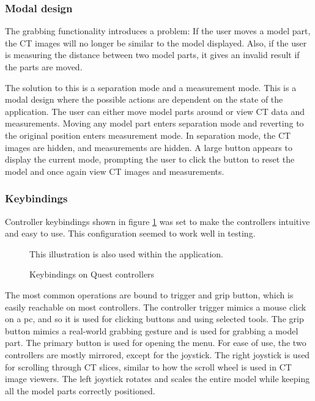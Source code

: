 \documentclass[a4paper]{report}
\begin{document}
\subsubsection{Modal design}
The grabbing functionality introduces a problem: If the user moves a model part, the CT images will no longer be similar to the model displayed. Also, if the user is measuring the distance between two model parts, it gives an invalid result if the parts are moved.

The solution to this is a separation mode and a measurement mode. This is a modal design where the possible actions are dependent on the state of the application. The user can either move model parts around or view CT data and measurements. Moving any model part enters separation mode and reverting to the original position enters measurement mode. In separation mode, the CT images are hidden, and measurements are hidden. A large button appears to display the current mode, prompting the user to click the button to reset the model and once again view CT images and measurements.

\subsubsection{Keybindings}
Controller keybindings shown in figure \ref{controllers} was set to make the controllers intuitive and easy to use. This configuration seemed to work well in testing.

\begin{figure}[h!]
    \centering
	\hfill
	\caption{Keybindings on Quest controllers}\label{controllers}
  \small
  This illustration is also used within the application.
\end{figure}

The most common operations are bound to trigger and grip button, which is easily reachable on most controllers. The controller trigger mimics a mouse click on a pc, and so it is used for clicking buttons and using selected tools. The grip button mimics a real-world grabbing gesture and is used for grabbing a model part.
The primary button is used for opening the menu.
For ease of use, the two controllers are mostly mirrored, except for the joystick. The right joystick is used for scrolling through CT slices, similar to how the scroll wheel is used in CT image viewers. The left joystick rotates and scales the entire model while keeping all the model parts correctly positioned.
\end{document}
